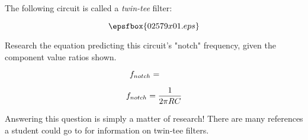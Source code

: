 

The following circuit is called a {\it twin-tee} filter:

$$\epsfbox{02579x01.eps}$$

Research the equation predicting this circuit's "notch" frequency, given the component value ratios shown.

$$f_{notch} = \hbox{\hskip 20pt}$$







$$f_{notch} = {1 \over {2 \pi R C}}$$







Answering this question is simply a matter of research!  There are many references a student could go to for information on twin-tee filters.




